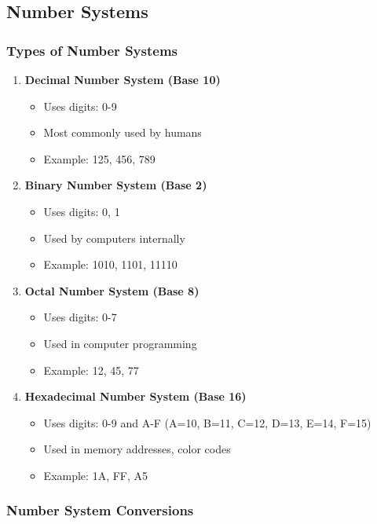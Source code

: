 \documentclass[12pt,a4paper]{article}
\begin{document}
\subsection{Number Systems}

\subsubsection{Types of Number Systems}

\begin{enumerate}
    \item \textbf{Decimal Number System (Base 10)}
    \begin{itemize}
        \item Uses digits: 0-9
        \item Most commonly used by humans
        \item Example: 125, 456, 789
    \end{itemize}
    
    \item \textbf{Binary Number System (Base 2)}
    \begin{itemize}
        \item Uses digits: 0, 1
        \item Used by computers internally
        \item Example: 1010, 1101, 11110
    \end{itemize}
    
    \item \textbf{Octal Number System (Base 8)}
    \begin{itemize}
        \item Uses digits: 0-7
        \item Used in computer programming
        \item Example: 12, 45, 77
    \end{itemize}
    
    \item \textbf{Hexadecimal Number System (Base 16)}
    \begin{itemize}
        \item Uses digits: 0-9 and A-F (A=10, B=11, C=12, D=13, E=14, F=15)
        \item Used in memory addresses, color codes
        \item Example: 1A, FF, A5
    \end{itemize}
\end{enumerate}

\subsubsection{Number System Conversions}
\end{document}
